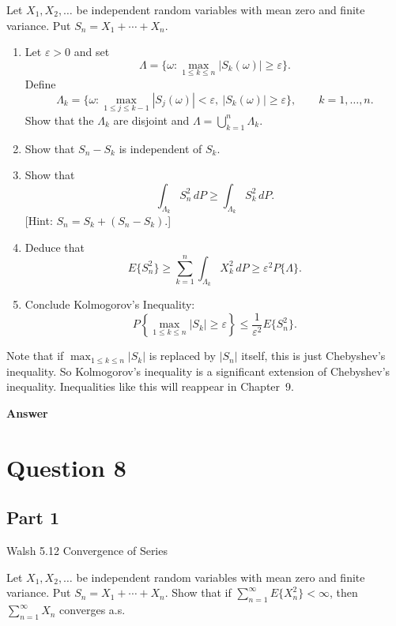 \documentclass[letterpaper]{article}
\begin{document}
		Let $X_1,X_2,\ldots$ be independent random variables with mean zero and finite variance. Put $S_n=X_1+\cdots+X_n$.
		\begin{enumerate}
			\item[(a)] Let $\varepsilon>0$ and set
			\[
			\Lambda=\{\omega:\max_{1\le k\le n}|S_k(\omega)|\ge \varepsilon\}.
			\]
			Define
			\[
			\Lambda_k=\{\omega:\max_{1\le j\le k-1}|S_j(\omega)|<\varepsilon,\ |S_k(\omega)|\ge \varepsilon\},
			\qquad k=1,\ldots,n.
			\]
			Show that the $\Lambda_k$ are disjoint and $\Lambda=\bigcup_{k=1}^n \Lambda_k$.
			
			\item[(b)] Show that $S_n-S_k$ is independent of $S_k$.
			
			\item[(c)] Show that
			\[
			\int_{\Lambda_k} S_n^2\,dP \ge \int_{\Lambda_k} S_k^2\,dP.
			\]
			[Hint: $S_n=S_k+(S_n-S_k)$.]
			
			\item[(d)] Deduce that
			\[
			E\{S_n^2\}\ge \sum_{k=1}^n \int_{\Lambda_k} X_k^2\,dP
			\ge \varepsilon^2 P\{\Lambda\}.
			\]
			
			\item[(e)] Conclude {Kolmogorov's Inequality}:
			\begin{equation}
				P\left\{\max_{1\le k\le n}|S_k|\ge \varepsilon\right\}
				\le \frac{1}{\varepsilon^2} E\{S_n^2\}.
				\tag{5.4}
			\end{equation}
		\end{enumerate}
		
		Note that if $\max_{1\le k\le n}|S_k|$ is replaced by $|S_n|$ itself, this is just Chebyshev's inequality. So Kolmogorov's inequality is a significant extension of Chebyshev's inequality. Inequalities like this will reappear in Chapter~9.
		
		\textbf{Answer}
		
		\clearpage
		
		\section{Question 8}
		
		\subsection{Part 1}
			{\color{deepred}  Walsh 5.12 Convergence of Series}
			
			 Let $X_1,X_2,\ldots$ be independent random variables with mean zero and finite variance. Put $S_n=X_1+\cdots+X_n$. Show that if $\sum_{n=1}^{\infty} E\{X_n^2\}<\infty$, then $\sum_{n=1}^{\infty} X_n$ converges a.s.
				
\end{document}
